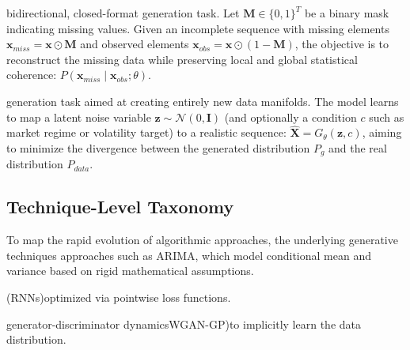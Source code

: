 bidirectional, closed-format generation task. Let $\mathbf{M} \in \{0, 1\}^T$ be a binary mask indicating missing values. Given an incomplete sequence with missing elements $\mathbf{x}_{miss} = \mathbf{x} \odot \mathbf{M}$ and observed elements $\mathbf{x}_{obs} = \mathbf{x} \odot (1-\mathbf{M})$, the objective is to reconstruct the missing data while preserving local and global statistical coherence: $P(\mathbf{x}_{miss} \mid \mathbf{x}_{obs}; \theta)$.

generation task aimed at creating entirely new data manifolds. The model learns to map a latent noise variable $\mathbf{z} \sim \mathcal{N}(0, \mathbf{I})$ (and optionally a condition $c$ such as market regime or volatility target) to a realistic sequence: $\hat{\mathbf{X}} = G_{\theta}(\mathbf{z}, c)$, aiming to minimize the divergence between the generated distribution $P_g$ and the real distribution $P_{data}$.

\subsection{Technique-Level Taxonomy}
To map the rapid evolution of algorithmic approaches, the underlying generative techniques approaches such as ARIMA, which model conditional mean and variance based on rigid mathematical assumptions.

(RNNs)optimized via pointwise loss functions.

generator-discriminator dynamicsWGAN-GP)to implicitly learn the data distribution.

